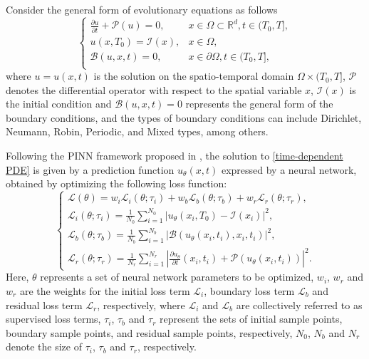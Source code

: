 \documentclass[preprint]{elsarticle}
\numberwithin{table}{section}
\numberwithin{equation}{section}
\numberwithin{figure}{section}
\begin{document}
\begin{CJK}{UTF8}{gbsn}
Consider the  general form of
evolutionary equations as follows
\begin{equation}\label{time-dependent PDE}
\begin{cases}
\frac{\displaystyle{\partial u}}{\displaystyle{\partial t}} + \mathcal{P}(u)=0,&x\in \Omega \subset \mathbb{R}^{d},t\in(T_0,T],\\
u(x,T_0)=\mathcal{I}(x),&x\in \Omega,\\
\mathcal{B}(u, x, t)=0,&x\in \partial \Omega, t\in(T_0,T],\\
\end{cases}
\end{equation}
where $u=u(x,t)$ is the solution on the spatio-temporal domain $\Omega \times (T_0, T]$, 
$\mathcal{P}$ denotes the differential operator   with respect to the spatial variable $x$, $\mathcal{I}(x)$ is the initial  {condition}  and $\mathcal{B}(u,x,t)=0$ represents the general form of the boundary conditions, and the types of boundary conditions can include Dirichlet, Neumann, Robin, Periodic, and Mixed types, among others.

 
 


Following the PINN framework proposed in \cite{RAISSI1}, the solution to   \eqref{time-dependent PDE} is given by a prediction function $u_\theta(x,t)$ expressed by a neural network, obtained by optimizing the following loss function:
\begin{equation}\label{loss_std}
\begin{cases}
\mathcal{L}(\theta)=w_i\mathcal{L}_i(\theta;\tau_i)+w_b\mathcal{L}_b(\theta;\tau_b)+w_r\mathcal{L}_r(\theta;\tau_r),\\
\mathcal{L}_i(\theta;\tau_{i})=\frac{1}{N_0} \sum_{i=1}^{N_0}\left| u_\theta \left(x_i,T_0\right)-\mathcal{I}(x_i)  \right|^2, \\
\mathcal{L}_b(\theta;\tau_{b})= \frac{1}{N_b} \sum_{i=1}^{N_b}\left|\mathcal{B}(  u_\theta(x_i,t_i),x_i,t_i)\right|^2 , \\
\mathcal{L}_r(\theta;\tau_{r})=\frac{1}{N_r} \sum_{i=1}^{N_r}\left| \frac{\displaystyle{\partial u_{\theta}}}{\displaystyle{\partial t}}(x_i,t_i) +  \mathcal{P}(u_\theta(x_i,t_i)) \right|^2.
\end{cases}
\end{equation}
Here,  
$\theta$ represents a set of neural network parameters to be optimized, $w_i$, $w_r$ and $w_r$
  are the weights for the initial loss term 
  $\mathcal{L}_i$, boundary loss term $\mathcal{L}_b$ and residual loss term $\mathcal{L}_r$, respectively, where $\mathcal{L}_i$ and $\mathcal{L}_b$
  are collectively referred to as supervised loss terms, $\tau_i$, $\tau_b$ and ${\tau_r}$
  represent the sets of initial  {sample}   points, boundary  {sample}  points, and residual  {sample} points, respectively,
  {
   $N_0$, $N_b$ and $N_r$  denote the size of $\tau_i$, $\tau_b$ and ${\tau_r}$, respectively.}


\end{CJK}
\end{document}
